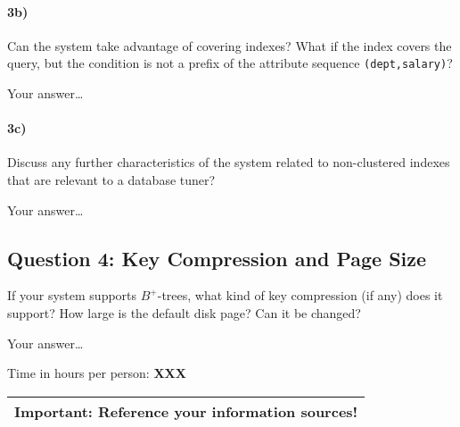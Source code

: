 \documentclass[11pt]{scrartcl}
\begin{document}
\paragraph{3b)} Can the system take advantage of covering indexes? What if the
index covers the query, but the condition is not a prefix of the
attribute sequence {\tt (dept,salary)}?


\smallskip

Your answer\dots

\paragraph{3c)} Discuss any further characteristics of the system related to
non-clustered indexes that are relevant to a database tuner?

\smallskip

Your answer\dots

\subsection*{Question 4: Key Compression and Page Size} If your system
supports $B^+$-trees, what kind of key compression (if any) does it
support?  How large is the default disk page? Can it be changed?


\smallskip

Your answer\dots


\bigskip

\noindent Time in hours per person: {\bf XXX}

\bigskip

\begin{center}
  \begin{tabular}{c}
    \hline
    {\bf Important:} Reference your information sources!
    \\\hline
  \end{tabular}
\end{center}
\end{document}
